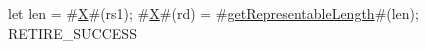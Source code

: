 let len = #\hyperref[sailRISCVzX]{X}#(rs1);
#\hyperref[sailRISCVzX]{X}#(rd) = #\hyperref[sailRISCVzgetRepresentableLength]{getRepresentableLength}#(len);
RETIRE_SUCCESS
